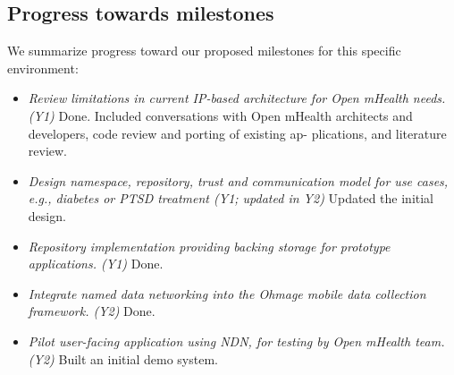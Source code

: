 \documentclass{article}
\begin{document}
\subsection{Progress towards milestones}
We summarize progress toward our proposed milestones for this specific environment:
\begin{itemize}
	\item \textit{Review limitations in current IP-based architecture for Open mHealth needs. (Y1)} Done. Included conversations with Open mHealth architects and developers, code review and porting of existing ap- plications, and literature review. 
	\item \textit{Design namespace, repository, trust and communication model for use cases, e.g., diabetes or PTSD treatment (Y1; updated in Y2)} Updated the initial design.
	\item \textit {Repository implementation providing backing storage for prototype applications. (Y1)} Done.
	\item \textit {Integrate named data networking into the Ohmage mobile data collection framework. (Y2)} Done.
	\item \textit {Pilot user-facing application using NDN, for testing by Open mHealth team. (Y2)} Built an initial demo system.
\end{itemize}




\end{document}
